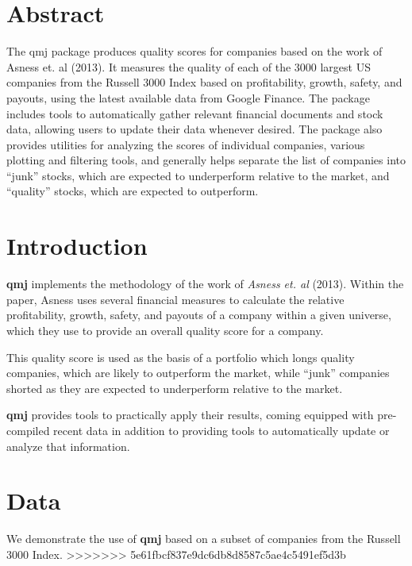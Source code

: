 \documentclass[titlepage]{article}
\begin{document}
\section{Abstract}
The qmj package produces quality scores for companies based on the work of Asness et. al (2013). It measures the quality of each of the 3000 largest US companies from the Russell 3000 Index based on profitability, growth, safety, and payouts, using the latest available data from Google Finance. The package includes tools to automatically gather relevant financial documents and stock data, allowing users to update their data whenever desired. The package also provides utilities for analyzing the scores of individual companies, various plotting and filtering tools, and generally helps separate the list of companies into ``junk'' stocks, which are expected to underperform relative to the market, and ``quality'' stocks, which are expected to outperform. 

\section*{Introduction}
\textbf{qmj} implements the methodology of the work of \emph{Asness et. al} (2013). Within the paper, Asness uses several financial measures to calculate the relative profitability, growth, safety, and payouts of a company within a given universe, which they use to provide an overall quality score for a company.

This quality score is used as the basis of a portfolio which longs quality companies, which are likely to outperform the market, while ``junk'' companies shorted as they are expected to underperform relative to the market.

\textbf{qmj} provides tools to practically apply their results, coming equipped with pre-compiled recent data in addition to providing tools to automatically update or analyze that information.

\section*{Data}
We demonstrate the use of \textbf{qmj} based on a subset of companies from the Russell 3000 Index. 
>>>>>>> 5e61fbcf837e9dc6db8d8587c5ae4c5491ef5d3b
\end{document}
